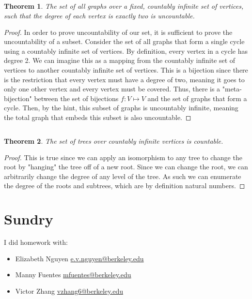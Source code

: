 \documentclass{article}
\newtheorem{theorem}{Theorem}
\begin{document}
\subsection{}

\begin{theorem}
    The set of all graphs over a fixed, countably infinite set of vertices, such that the degree of each vertex is exactly two is uncountable.
\end{theorem}
\begin{proof}
    In order to prove uncountability of our set, it is sufficient to prove the uncountability of a subset.
    Consider the set of all graphs that form a single cycle using a countably infinite set of vertices.
    By definition, every vertex in a cycle has degree 2.
    We can imagine this as a mapping from the countably infinite set of vertices to another countably infinite set of vertices.
    This is a bijection since there is the restriction that every vertex must have a degree of two, meaning it goes to only one other vertex and every vertex must be covered.
    Thus, there is a "meta-bijection" between the set of bijections \(f: V \mapsto V\) and the set of graphs that form a cycle.
    Then, by the hint, this subset of graphs is uncountably infinite, meaning the total graph that embeds this subset is also uncountable.
\end{proof}

\subsection{}

\begin{theorem}
    The set of trees over countably infinite vertices is countable.
\end{theorem}
\begin{proof}
    This is true since we can apply an isomorphism to any tree to change the root by "hanging" the tree off of a new root.
    Since we can change the root, we can arbitrarily change the degree of any level of the tree.
    As such we can enumerate the degree of the roots and subtrees, which are by definition natural numbers.
\end{proof}

\section{Sundry}

I did homework with:
\begin{itemize}
    \item Elizabeth Nguyen \href{mailto:e.v.nguyen@berkeley.edu}{e.v.nguyen@berkeley.edu}
    \item Manny Fuentes \href{mailto:mfuentes@berkeley.edu}{mfuentes@berkeley.edu}
    \item Victor Zhang \href{mailto:vzhang6@berkeley.edu}{vzhang6@berkeley.edu}
\end{itemize}
\end{document}
